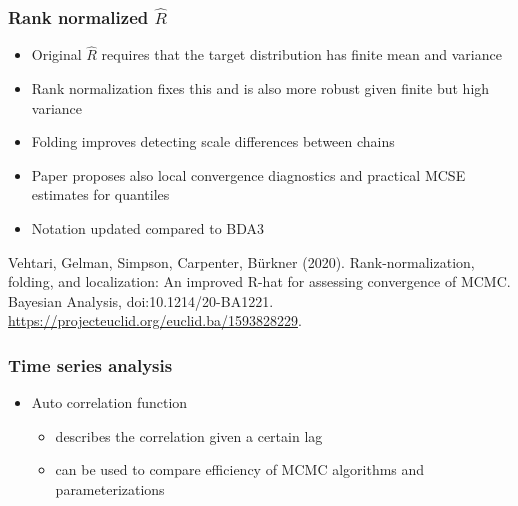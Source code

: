 \documentclass[10pt]{beamer}
\begin{document}
\begin{frame}[fragile]

\frametitle{ Rank normalized $\widehat{R}$}

  \begin{itemize}
  \item<+-> Original $\widehat{R}$ requires that the target distribution
    has finite mean and variance
  \item<+-> Rank normalization fixes this and is also more robust given
    finite but high variance
  \item<+-> Folding improves detecting scale differences between chains
  \item<+-> Paper proposes also local convergence diagnostics and
    practical MCSE estimates for quantiles
  \item<+-> Notation updated compared to BDA3
  \end{itemize}

    Vehtari, Gelman, Simpson, Carpenter, Bürkner
  (2020). Rank-normalization, folding, and localization: An improved
  R-hat for assessing convergence of MCMC. Bayesian Analysis, doi:10.1214/20-BA1221. \url{https://projecteuclid.org/euclid.ba/1593828229}.

\end{frame}

\begin{frame}

\frametitle{ Time series analysis}

  \begin{itemize}
  \item Auto correlation function
    \begin{itemize}
    \item describes the correlation given a certain lag
    \item can be used to compare efficiency of MCMC algorithms and parameterizations
    \end{itemize}
  \end{itemize}
\end{frame}
\end{document}
